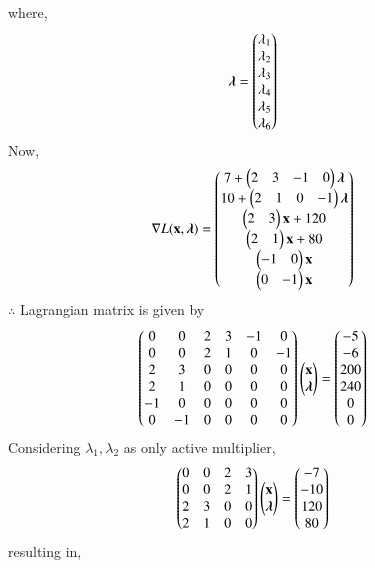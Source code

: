 \documentclass[journal,12pt,twocolumn]{IEEEtran}
\begin{document}
where,
\begin{align}
    \boldsymbol{\lambda} &= \begin{pmatrix}\lambda_1 \\ \lambda_2 \\ \lambda_3 \\ \lambda_4 \\ \lambda_5 \\ \lambda_6\end{pmatrix}
\end{align}
Now,
\begin{align}
    \nabla L(\mathbf{x},\boldsymbol{\lambda}) &= \begin{pmatrix}7+ \begin{pmatrix}2 & 3 & -1 & 0 \end{pmatrix}\boldsymbol{\lambda}\\ 10+\begin{pmatrix}2 & 1 & 0 & -1\end{pmatrix}\boldsymbol{\lambda} \\ \begin{pmatrix}2 & 3\end{pmatrix}\mathbf{x}+120 \\ \begin{pmatrix}2 & 1\end{pmatrix}\mathbf{x}+80 \\ \begin{pmatrix}-1 & 0\end{pmatrix}\mathbf{x} \\ \begin{pmatrix}0 & -1\end{pmatrix}\mathbf{x}\end{pmatrix}
\end{align}
$\therefore$ Lagrangian matrix is given by
\begin{align}
    \begin{pmatrix}0 & 0 & 2 & 3 & -1 & 0 \\ 0 & 0 & 2 & 1 & 0 & -1 \\ 2 & 3 & 0 & 0 & 0 & 0  \\ 2 & 1 & 0 & 0 & 0 & 0  \\ -1 & 0 & 0 & 0 & 0 & 0  \\ 0 & -1 & 0 & 0 & 0 & 0 \end{pmatrix}\begin{pmatrix}\mathbf{x} \\ \boldsymbol{\lambda} \end{pmatrix} &= \begin{pmatrix}-5 \\ -6 \\ 200 \\ 240 \\ 0 \\0 \end{pmatrix}
\end{align}
Considering $\lambda_1,\lambda_2$ as only active multiplier,
\begin{align}
    \begin{pmatrix}0 & 0 & 2 & 3 \\ 0 & 0 & 2 & 1 \\ 2 & 3 & 0 & 0 \\ 2 & 1 & 0 & 0\end{pmatrix}\begin{pmatrix}\mathbf{x}\\ \boldsymbol{\lambda}\end{pmatrix} &=\begin{pmatrix}-7 \\ -10 \\ 120 \\ 80\end{pmatrix}
\end{align}
resulting in,
\end{document}
